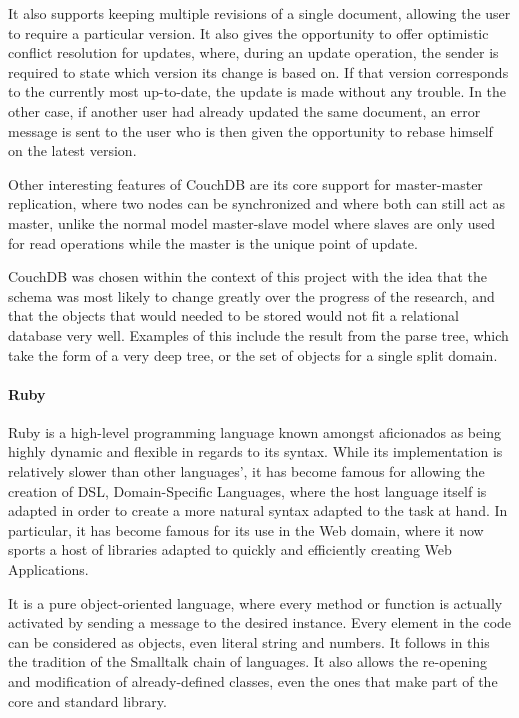 It also supports keeping multiple revisions of a single document, allowing the user to require a particular version. It also gives the opportunity to offer optimistic conflict resolution for updates, where, during an update operation, the sender is required to state which version its change is based on. If that version corresponds to the currently most up-to-date, the update is made without any trouble. In the other case, if another user had already updated the same document, an error message is sent to the user who is then given the opportunity to rebase himself on the latest version.

Other interesting features of CouchDB are its core support for master-master replication, where two nodes can be synchronized and where both can still act as master, unlike the normal model master-slave model where slaves are only used for read operations while the master is the unique point of update.

CouchDB was chosen within the context of this project with the idea that the schema was most likely to change greatly over the progress of the research, and that the objects that would needed to be stored would not fit a relational database very well. Examples of this include the result from the parse tree, which take the form of a very deep tree, or the set of objects for a single split domain.


\paragraph{Ruby} %
\label{par:ruby}

Ruby is a high-level programming language known amongst aficionados as being highly dynamic and flexible in regards to its syntax. While its implementation is relatively slower than other languages', it has become famous for allowing the creation of DSL, Domain-Specific Languages, where the host language itself is adapted in order to create a more natural syntax adapted to the task at hand. In particular, it has become famous for its use in the Web domain, where it now sports a host of libraries adapted to quickly and efficiently creating Web Applications.

It is a pure object-oriented language, where every method or function is actually activated by sending a message to the desired instance. Every element in the code can be considered as objects, even literal string and numbers. It follows in this the tradition of the Smalltalk chain of languages. It also allows the re-opening and modification of already-defined classes, even the ones that make part of the core and standard library.

